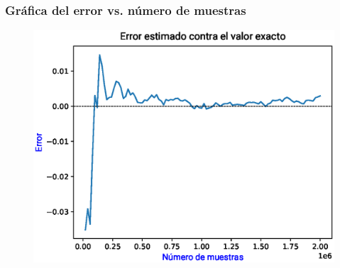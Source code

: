 \documentclass[12pt]{beamer}
\begin{document}
\begin{frame}
\frametitle{Gráfica del error vs. número de muestras}
\begin{figure}
    \centering
    \includegraphics[scale=0.55]{Imagenes/area_puntos_07_error.eps}
\end{figure}
\end{frame}
\end{document}
